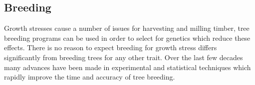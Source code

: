 \subsection{Breeding}
Growth stresses cause a number of issues for harvesting and milling
timber, tree breeding programs can be used in order to select for
genetics which reduce these effects. There is no reason to expect  breeding for
growth stress differs significantly from breeding trees for
any other trait. Over the last few decades many advances have been made in
experimental and statistical techniques which rapidly improve the time and
accuracy of tree breeding.